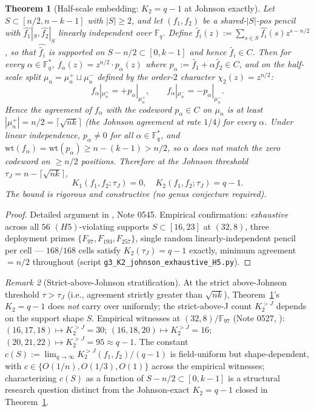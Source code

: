 \documentclass[11pt]{article}
\newtheorem{theorem}{Theorem}[section]
\theoremstyle{definition}
\theoremstyle{remark}
\newtheorem{remark}[theorem]{Remark}
\newcommand{\FF}{\mathbb{F}}
\begin{document}
\begin{theorem}[Half-scale embedding: $K_2 = q - 1$ at Johnson exactly]
\label{thm:K2-half-scale-lower}
Let $S \subset [n/2, n - k - 1]$ with $|S| \geq 2$, and let $(f_1, f_2)$
be a shared-$|S|$-pos pencil with $\widehat{f_1}|_S, \widehat{f_2}|_S$
linearly independent over $\FF_q$. Define
$\widetilde{f_i}(z) := \sum_{s \in S} \widehat{f_i}(s) z^{s - n/2}$,
so that $\widehat{\widetilde{f_i}}$ is supported on $S - n/2 \subset
[0, k-1]$ and hence $\widetilde{f_i} \in C$. Then for every $\alpha \in
\FF_q^*$, $f_\alpha(z) = z^{n/2} \cdot p_\alpha(z)$ where
$p_\alpha := \widetilde{f_1} + \alpha \widetilde{f_2} \in C$, and on
the half-scale split $\mu_n = \mu_n^+ \sqcup \mu_n^-$ defined by the
order-$2$ character $\chi_2(z) = z^{n/2}$:
\[
 f_\alpha|_{\mu_n^+} = +p_\alpha|_{\mu_n^+}, \qquad
 f_\alpha|_{\mu_n^-} = -p_\alpha|_{\mu_n^-}.
\]
Hence the agreement of $f_\alpha$ with the codeword $p_\alpha \in C$ on
$\mu_n$ is at least $|\mu_n^+| = n/2 = \lceil\sqrt{nk}\rceil$ (the
Johnson agreement at rate $1/4$) for every $\alpha$. Under linear
independence, $p_\alpha \neq 0$ for all $\alpha \in \FF_q^*$, and
$\mathrm{wt}(f_\alpha) = \mathrm{wt}(p_\alpha) \geq n - (k - 1) > n/2$,
so $\alpha$ does not match the zero codeword on $\geq n/2$ positions.
Therefore at the Johnson threshold $\tau_J = n - \lceil\sqrt{nk}\rceil$,
\[
 \boxed{\quad K_1(f_1, f_2; \tau_J) = 0, \quad K_2(f_1, f_2; \tau_J) = q - 1. \quad}
\]
The bound is rigorous and constructive (no genus conjecture required).
\end{theorem}

\begin{proof}
Detailed argument in \cite{CompanionRepo}, Note 0545. Empirical
confirmation: \emph{exhaustive} across all $56$ $(H5)$-violating
supports $S \subset [16, 23]$ at $(32, 8)$, three deployment primes
$\{F_{97}, F_{193}, F_{257}\}$, single random linearly-independent
pencil per cell — $168/168$ cells satisfy $K_2(\tau_J) = q - 1$ exactly,
minimum agreement $= n/2$ throughout (script
\texttt{g3\_K2\_johnson\_exhaustive\_H5.py}).
\end{proof}

\begin{remark}[Strict-above-Johnson stratification]
\label{rem:K2-half-scale-strict}
At the strict above-Johnson threshold $\tau > \tau_J$ (i.e., agreement
strictly greater than $\sqrt{nk}$), Theorem~\ref{thm:K2-half-scale-lower}'s
$K_2 = q - 1$ does \emph{not} carry over uniformly; the strict-above-J
count $K_2^{>J}$ depends on the support shape $S$. Empirical witnesses at
$(32, 8)/\FF_{97}$ (Note 0527, \cite{CompanionRepo}):
$(16, 17, 18) \mapsto K_2^{>J} = 30$;
$(16, 18, 20) \mapsto K_2^{>J} = 16$;
$(20, 21, 22) \mapsto K_2^{>J} = 95 \approx q - 1$.
The constant
$c(S) := \lim_{q \to \infty} K_2^{>J}(f_1, f_2) / (q - 1)$
is field-uniform but shape-dependent, with $c \in \{O(1/n), O(1/3), O(1)\}$
across the empirical witnesses; characterizing $c(S)$ as a function of
$S - n/2 \subset [0, k - 1]$ is a structural research question
distinct from the Johnson-exact $K_2 = q - 1$ closed in
Theorem~\ref{thm:K2-half-scale-lower}.
\end{remark}
\end{document}
